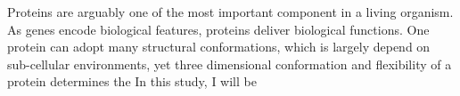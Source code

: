 Proteins are arguably one of the most important component in a living organism. As genes encode biological features, proteins deliver biological functions. One protein can adopt many structural conformations, which is largely depend on sub-cellular environments, yet three dimensional conformation and flexibility of a protein determines the     In this study, I will be 